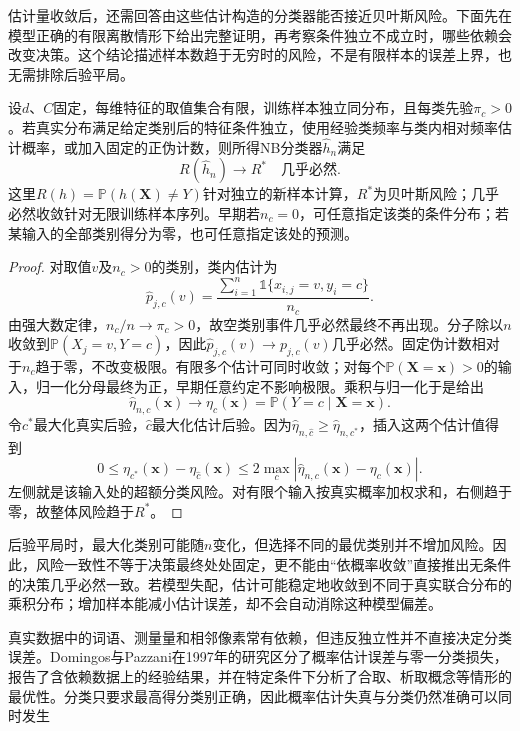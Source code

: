 估计量收敛后，还需回答由这些估计构造的分类器能否接近贝叶斯风险。下面先在模型正确的有限离散情形下给出完整证明，再考察条件独立不成立时，哪些依赖会改变决策。这个结论描述样本数趋于无穷时的风险，不是有限样本的误差上界，也无需排除后验平局。
\begin{theorem}[有限离散特征下NB的风险一致性]
  \label{thm:classification-naive-bayes-consistency}
  设$d$、$C$固定，每维特征的取值集合有限，训练样本独立同分布，且每类先验$\pi_c>0$。若真实分布满足给定类别后的特征条件独立，使用经验类频率与类内相对频率估计概率，或加入固定的正伪计数，则所得NB分类器$\hat h_n$满足
  \[
    R(\hat h_n)\longrightarrow R^\ast
    \quad\text{几乎必然}.
  \]
  这里$R(h)=\mathbb{P}(h(\bm{X})\neq Y)$针对独立的新样本计算，$R^\ast$为贝叶斯风险；几乎必然收敛针对无限训练样本序列。早期若$n_c=0$，可任意指定该类的条件分布；若某输入的全部类别得分为零，也可任意指定该处的预测。
\end{theorem}
\begin{proof}
  对取值$v$及$n_c>0$的类别，类内估计为
  \[
    \hat p_{j,c}(v)
    =\frac{\sum_{i=1}^{n}\mathbb{1}\{x_{i,j}=v,y_i=c\}}
           {n_c}.
  \]
  由强大数定律，$n_c/n\to\pi_c>0$，故空类别事件几乎必然最终不再出现。分子除以$n$收敛到$\mathbb{P}(X_j=v,Y=c)$，因此$\hat p_{j,c}(v)\to p_{j,c}(v)$几乎必然。固定伪计数相对于$n_c$趋于零，不改变极限。有限多个估计可同时收敛；对每个$\mathbb{P}(\bm{X}=\bm{x})>0$的输入，归一化分母最终为正，早期任意约定不影响极限。乘积与归一化于是给出
  \[
    \hat\eta_{n,c}(\bm{x})
    \longrightarrow
    \eta_c(\bm{x})=\mathbb{P}(Y=c\mid\bm{X}=\bm{x}).
  \]
  令$c^\ast$最大化真实后验，$\hat c$最大化估计后验。因为$\hat\eta_{n,\hat c}\geq\hat\eta_{n,c^\ast}$，插入这两个估计值得到
  \[
    0\leq\eta_{c^\ast}(\bm{x})-\eta_{\hat c}(\bm{x})
    \leq2\max_c|\hat\eta_{n,c}(\bm{x})-\eta_c(\bm{x})|.
  \]
  左侧就是该输入处的超额分类风险。对有限个输入按真实概率加权求和，右侧趋于零，故整体风险趋于$R^\ast$。
\end{proof}

后验平局时，最大化类别可能随$n$变化，但选择不同的最优类别并不增加风险。因此，风险一致性不等于决策最终处处固定，更不能由“依概率收敛”直接推出无条件的决策几乎必然一致。若模型失配，估计可能稳定地收敛到不同于真实联合分布的乘积分布；增加样本能减小估计误差，却不会自动消除这种模型偏差。

真实数据中的词语、测量量和相邻像素常有依赖，但违反独立性并不直接决定分类误差。Domingos与Pazzani在1997年的研究区分了概率估计误差与零一分类损失，报告了含依赖数据上的经验结果，并在特定条件下分析了合取、析取概念等情形的最优性。分类只要求最高得分类别正确，因此概率估计失真与分类仍然准确可以同时发生

